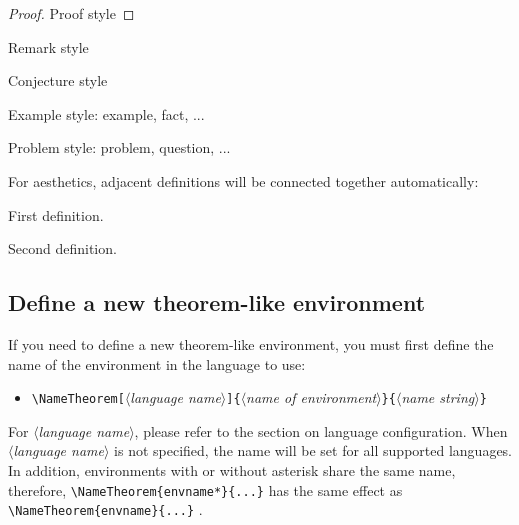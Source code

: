 \documentclass[allowbf]{colorart}
\providecommand{\meta}[1]{$\langle${\normalfont\itshape#1}$\rangle$}
\begin{document}
\begin{proof}
    Proof style
\end{proof}

\begin{remark}
    Remark style
\end{remark}

\begin{conjecture}
    Conjecture style
\end{conjecture}

\begin{example*}
    Example style: example, fact, ...
\end{example*}

\begin{problem}
    Problem style: problem, question, ...
\end{problem}

\medskip
For aesthetics, adjacent definitions will be connected together automatically:
\begin{definition}
    First definition.
\end{definition}

\begin{definition}
    Second definition.
\end{definition}


\subsection{Define a new theorem-like environment}

If you need to define a new theorem-like environment, you must first define the name of the environment in the language to use:
\begin{itemize}
    \item \lstinline|\NameTheorem[|\meta{language name}\lstinline|]{|\meta{name of environment}\lstinline|}{|\meta{name string}\lstinline|}|
\end{itemize}
For \meta{language name}, please refer to the section on language configuration. When \meta{language name} is not specified, the name will be set for all supported languages. In addition, environments with or without asterisk share the same name, therefore, \lstinline|\NameTheorem{envname*}{...}| has the same effect as \lstinline|\NameTheorem{envname}{...}| .
\end{document}
